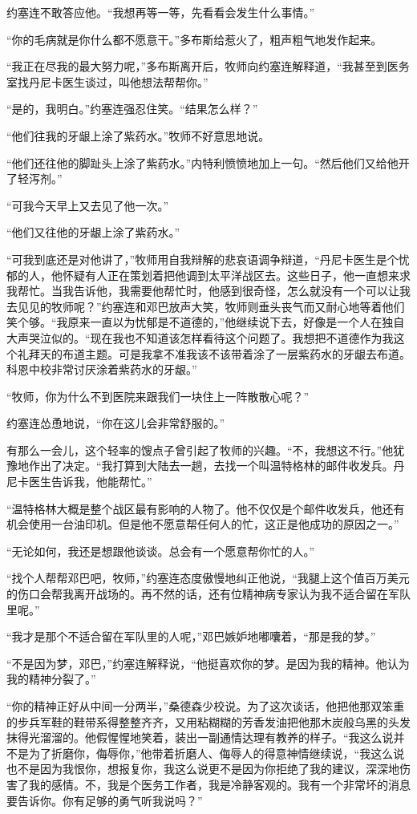     约塞连不敢答应他。“我想再等一等，先看看会发生什么事情。”

    “你的毛病就是你什么都不愿意干。”多布斯给惹火了，粗声粗气地发作起来。

    “我正在尽我的最大努力呢，”多布斯离开后，牧师向约塞连解释道，“我甚至到医务室找丹尼卡医生谈过，叫他想法帮帮你。”

    “是的，我明白。”约塞连强忍住笑。“结果怎么样？”

    “他们往我的牙龈上涂了紫药水。”牧师不好意思地说。

    “他们还往他的脚趾头上涂了紫药水。”内特利愤愤地加上一句。“然后他们又给他开了轻泻剂。”

    “可我今天早上又去见了他一次。”

    “他们又往他的牙龈上涂了紫药水。”

    “可我到底还是对他讲了，”牧师用自我辩解的悲哀语调争辩道，“丹尼卡医生是个忧郁的人，他怀疑有人正在策划着把他调到太平洋战区去。这些日子，他一直想来求我帮忙。当我告诉他，我需要他帮忙时，他感到很奇怪，怎么就没有一个可以让我去见见的牧师呢？”约塞连和邓巴放声大笑，牧师则垂头丧气而又耐心地等着他们笑个够。“我原来一直以为忧郁是不道德的，”他继续说下去，好像是一个人在独自大声哭泣似的。“现在我也不知道该怎样看待这个问题了。我想把不道德作为我这个礼拜天的布道主题。可是我拿不准我该不该带着涂了一层紫药水的牙龈去布道。科恩中校非常讨厌涂着紫药水的牙龈。”

    “牧师，你为什么不到医院来跟我们一块住上一阵散散心呢？”

    约塞连怂恿地说，“你在这儿会非常舒服的。”

    有那么一会儿，这个轻率的馊点子曾引起了牧师的兴趣。“不，我想这不行。”他犹豫地作出了决定。“我打算到大陆去一趟，去找一个叫温特格林的邮件收发兵。丹尼卡医生告诉我，他能帮忙。”

    “温特格林大概是整个战区最有影响的人物了。他不仅仅是个邮件收发兵，他还有机会使用一台油印机。但是他不愿意帮任何人的忙，这正是他成功的原因之一。”

    “无论如何，我还是想跟他谈谈。总会有一个愿意帮你忙的人。”

    “找个人帮帮邓巴吧，牧师，”约塞连态度傲慢地纠正他说，“我腿上这个值百万美元的伤口会帮我离开战场的。再不然的话，还有位精神病专家认为我不适合留在军队里呢。”

    “我才是那个不适合留在军队里的人呢，”邓巴嫉妒地嘟囔着，“那是我的梦。”

    “不是因为梦，邓巴，”约塞连解释说，“他挺喜欢你的梦。是因为我的精神。他认为我的精神分裂了。”

    “你的精神正好从中间一分两半，”桑德森少校说。为了这次谈话，他把他那双笨重的步兵军鞋的鞋带系得整整齐齐，又用粘糊糊的芳香发油把他那木炭般乌黑的头发抹得光溜溜的。他假惺惺地笑着，装出一副通情达理有教养的样子。“我这么说并不是为了折磨你，侮辱你，”他带着折磨人、侮辱人的得意神情继续说，“我这么说也不是因为我恨你，想报复你，我这么说更不是因为你拒绝了我的建议，深深地伤害了我的感情。不，我是个医务工作者，我是冷静客观的。我有一个非常坏的消息要告诉你。你有足够的勇气听我说吗？”

